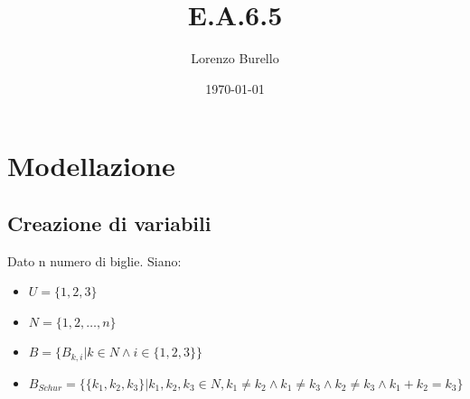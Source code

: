 \documentclass[a4paper, 12pt]{article}
\title{E.A.6.5}
\author{Lorenzo Burello}
\date{\today}
\begin{document}
\maketitle

\section{Modellazione}
\subsection{Creazione di variabili}
Dato n numero di biglie.\newline
Siano:
\begin{itemize}
    \item $U = \{1,2,3\}$
    \item $N = \{1,2,\ldots,n\}$
    \item $B = \{B_{k,i}| k\in N \land i \in \{1,2,3\}\}$
    \item $B_{Schur} = \{\{k_1,k_2,k_3\}| k_1,k_2,k_3\in N, k_1 \ne k_2 \land k_1 \ne k_3 \land k_2 \ne k_3 \land k_1+k_2=k_3 \}$
\end{itemize}
\end{document}
